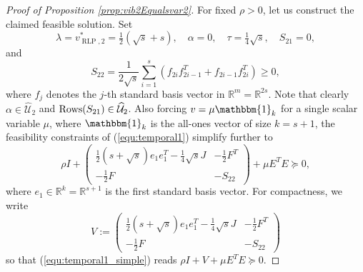 \documentclass[12pt]{article}
\DeclareMathOperator{\AR}{RLP}
\newcommand{\K}{\widehat{\mathcal{U}}}
\def\RR{{\mathbb{R}}}
\begin{document}
\begin{onehalfspace}
\begin{proof}[Proof of Proposition \ref{prop:vib2Equalsvar2}]
For fixed $\rho > 0$, let us construct the claimed feasible solution.
Set
\[
    \lambda = v^*_{\AR,2} = \tfrac12(\sqrt{s} + s), \quad
    \alpha = 0, \quad
    \tau = \tfrac14 \sqrt{s}, \quad
    S_{21} = 0,
\]
and
\[
    S_{22} = \frac{1}{2\sqrt{s}} \sum_{i=1}^{s}
    \left( f_{2i}f_{2i-1}^T + f_{2i-1}f_{2i}^T \right) \ge 0,
\]
where $f_{j}$ denotes the $j$-th standard basis vector in $\RR^m =
\RR^{2s}$. Note that clearly $\alpha \in \K_2$ and $\text{\rm Rows}(S_{21}) \in \K_2$. Also
forcing $v = \mu \mathbbm{1}_k$ for a single scalar variable $\mu$, where
$\mathbbm{1}_k$ is the all-ones vector of size $k = s+1$, the feasibility
constraints of (\ref{equ:temporal1}) simplify further to
\begin{equation} \label{equ:temporal1_simple}
\rho I +
\begin{pmatrix}
    \tfrac12 (s + \sqrt{s}) e_1e_1^T - \tfrac14 \sqrt{s} J &
    -\tfrac{1}{2}F^T \\
    -\tfrac{1}{2}F &
    -S_{22}
\end{pmatrix} 
+
\mu E^TE \succeq 0,
\end{equation}
where $e_1 \in \RR^k = \RR^{s+1}$ is the first standard basis vector. For
compactness, we write
\begin{equation} \label{equ:defnV}
    V := 
    \begin{pmatrix}
        \tfrac12 (s + \sqrt{s}) e_1e_1^T - \tfrac14 \sqrt{s} J &
        -\tfrac{1}{2}F^T \\
        -\tfrac{1}{2}F &
        -S_{22}
    \end{pmatrix}
\end{equation}
so that (\ref{equ:temporal1_simple}) reads $\rho I + V + \mu E^TE
\succeq 0$.


\end{proof}
\end{onehalfspace}
\end{document}
